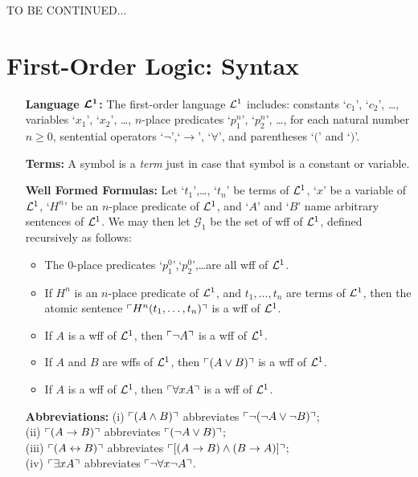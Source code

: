 \documentclass[a4paper, 11pt]{article} %
\begin{document}
\pagebreak
\noindent
TO BE CONTINUED...
\pagebreak





\section*{\sc First-Order Logic: Syntax}

\begin{enumerate}[leftmargin=1.2in] %
	\item[\bf Language $\boldsymbol{\mathcal{L}^1}$:] The first-order language $\mathcal{L}^1$ includes: constants `$c_1$', `$c_2$', \dots, variables `$x_1$', `$x_2$', \dots, $n$-place predicates `$p_1^n$', `$p_2^n$', \dots, for each natural number $n\geq0$, sentential operators `$\neg$',`$\rightarrow$', `$\forall$', and parentheses `$($' and `$)$'.
	\item[\bf Terms:] A symbol is a \textit{term} just in case that symbol is a constant or variable.
	\item[\bf Well Formed Formulas:] Let `$t_1$',\dots, `$t_n$' be terms of $\mathcal{L}^1$, `$x$' be a variable of $\mathcal{L}^1$, `$H^n$' be an $n$-place predicate of $\mathcal{L}^1$, and `$A$' and `$B$' name arbitrary sentences of $\mathcal{L}^1$. We may then let $\mathcal{G}_1$ be the set of wff of $\mathcal{L}^1$, defined recursively as follows:
	      \begin{itemize}
		      \item The 0-place predicates `$p_1^0$',`$p_2^0$',\dots are all wff of $\mathcal{L}^1$.
		      \item If ${H^n}$ is an $n$-place predicate of $\mathcal{L}^1$, and ${t_1},\dots,{t_n}$ are terms of $\mathcal{L}^1$, then the atomic sentence $\ulcorner H^n(t_1,\dots,t_n)\urcorner$ is a wff of $\mathcal{L}^1$.
		      \item If ${A}$ is a wff of $\mathcal{L}^1$, then $\ulcorner\neg A\urcorner$ is a wff of $\mathcal{L}^1$.
		      \item If ${A}$ and ${B}$ are wffs of $\mathcal{L}^1$, then $\ulcorner(A\vee B)\urcorner$ is a wff of $\mathcal{L}^1$.
		      \item If ${A}$ is a wff of $\mathcal{L}^1$, then $\ulcorner\forall xA\urcorner$ is a wff of $\mathcal{L}^1$.
	      \end{itemize}
	\item[\bf Abbreviations:] (i) $\ulcorner(A\wedge B)\urcorner$ abbreviates $\ulcorner\neg(\neg A\vee\neg B)\urcorner$;\\ (ii) $\ulcorner(A\rightarrow B)\urcorner$ abbreviates $\ulcorner(\neg A\vee B)\urcorner$;\\ (iii) $\ulcorner(A\leftrightarrow B)\urcorner$ abbreviates $\ulcorner[(A\rightarrow B)\wedge(B\rightarrow A)]\urcorner$;\\ (iv) $\ulcorner\exists xA\urcorner$ abbreviates $\ulcorner\neg\forall x\neg A\urcorner$.
\end{enumerate}
\end{document}
